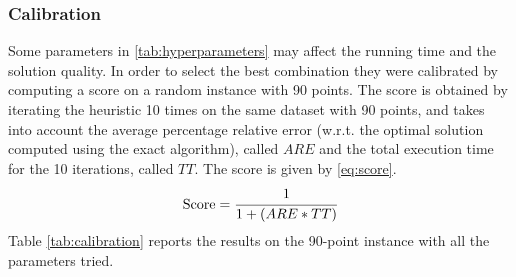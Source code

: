 \subsubsection{Calibration}
Some parameters in \cref{tab:hyperparameters} may affect the running time and the solution quality.
In order to select the best combination they were calibrated by computing a score on a random instance with 90 points. 
The score is obtained by iterating the heuristic 10 times on the same dataset with 90 points, and takes into account the average percentage relative error (w.r.t. the optimal solution computed using the exact algorithm), called $ARE$ and the total execution time for the 10 iterations, called $TT$. The score is given by \cref{eq:score}.
\begin{equation}
	\text{Score} = \cfrac{1}{1 + (ARE * TT)}
	\label{eq:score}
\end{equation}
Table \ref{tab:calibration} reports the results on the 90-point instance with all the parameters tried.







